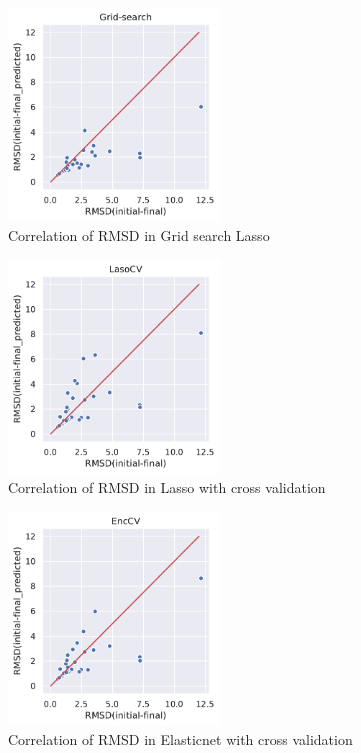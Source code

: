 \documentclass[12pt,twoside]{article}
\begin{document}
\begin{figure}[h]
\centering
\includegraphics[width=0.5\textwidth]{Grid-search.pdf}
\caption{Correlation of RMSD in Grid search Lasso}
\label{fig:hist2}
\end{figure} 
\begin{figure}[h]
\centering
\includegraphics[width=0.5\textwidth]{LassoCV.pdf}
\caption{Correlation of RMSD in Lasso with cross validation}
\label{fig:hist2}
\end{figure} 
\begin{figure}[h]
\centering
\includegraphics[width=0.5\textwidth]{EncCV.pdf}
\caption{Correlation of RMSD in Elasticnet with cross validation}
\label{fig:hist2}
\end{figure} 
\end{document}
